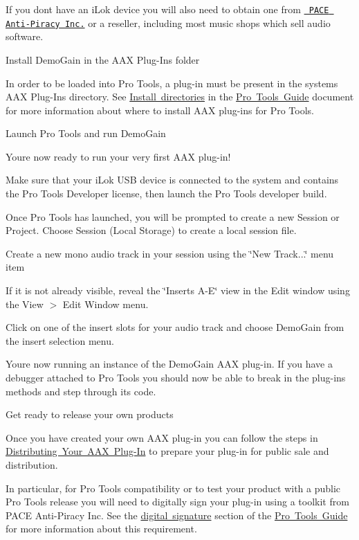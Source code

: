 \begin{DoxyItemize}
If you don\textquotesingle{}t have an i\+Lok device you will also need to obtain one from \href{https://www.ilok.com}{\texttt{ P\+A\+CE Anti-\/\+Piracy Inc.}} or a reseller, including most music shops which sell audio software. 


\item  Install Demo\+Gain in the A\+AX Plug-\/\+Ins folder  

In order to be loaded into Pro Tools, a plug-\/in must be present in the system\textquotesingle{}s A\+AX Plug-\/\+Ins directory. See \mbox{\hyperlink{a00830_subsection__install_directories_}{Install directories}} in the \mbox{\hyperlink{a00830}{Pro Tools Guide}} document for more information about where to install A\+AX plug-\/ins for Pro Tools. 


\item  Launch Pro Tools and run Demo\+Gain  

You\textquotesingle{}re now ready to run your very first A\+AX plug-\/in! 
\begin{DoxyEnumerate}
\item Make sure that your i\+Lok U\+SB device is connected to the system and contains the Pro Tools Developer license, then launch the Pro Tools developer build.  
\item Once Pro Tools has launched, you will be prompted to create a new Session or Project. Choose Session (Local Storage) to create a local session file.  
\item Create a new mono audio track in your session using the \char`\"{}\+New Track...\char`\"{} menu item  
\item If it is not already visible, reveal the \char`\"{}\+Inserts A-\/\+E\char`\"{} view in the Edit window using the View $>$ Edit Window menu.  
\item Click on one of the insert slots for your audio track and choose Demo\+Gain from the insert selection menu.  
\end{DoxyEnumerate}



You\textquotesingle{}re now running an instance of the Demo\+Gain A\+AX plug-\/in. If you have a debugger attached to Pro Tools you should now be able to break in the plug-\/in\textquotesingle{}s methods and step through its code. 


\item  Get ready to release your own products  

Once you have created your own A\+AX plug-\/in you can follow the steps in \mbox{\hyperlink{a00843}{Distributing Your A\+AX Plug-\/\+In}} to prepare your plug-\/in for public sale and distribution. 



In particular, for Pro Tools compatibility or to test your product with a public Pro Tools release you will need to digitally sign your plug-\/in using a toolkit from P\+A\+CE Anti-\/\+Piracy Inc. See the \mbox{\hyperlink{a00830_subsection__digital_signature_}{digital signature}} section of the \mbox{\hyperlink{a00830}{Pro Tools Guide}} for more information about this requirement. 


\end{DoxyItemize}



